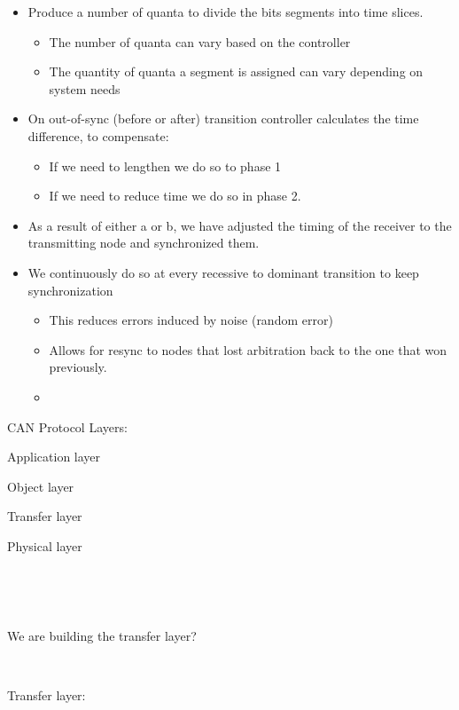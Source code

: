 \begin{itemize}
\item
  Produce a number of quanta to divide the bits\textquotesingle{}
  segments into time slices.

  \begin{itemize}
  \item
    The number of quanta can vary based on the controller
  \item
    The quantity of quanta a segment is assigned can vary depending on
    system needs
  \end{itemize}
\item
  On out-of-sync (before or after) transition controller calculates the time
  difference, to compensate:

  \begin{itemize}
  \item
    If we need to lengthen we do so to phase 1
  \item
    If we need to reduce time we do so in phase 2.
  \end{itemize}
\item
  As a result of either a or b, we have adjusted the timing of the
  receiver to the transmitting node and synchronized them.
\item
  We continuously do so at every recessive to dominant transition to
  keep synchronization

  \begin{itemize}
  \item
    This reduces errors induced by noise (random error)
  \item
    Allows for resync to nodes that lost arbitration back to the one
    that won previously.
  \item
  \end{itemize}
\end{itemize}

CAN Protocol Layers:

Application layer

Object layer

Transfer layer

Physical layer

~

~

We are building the transfer layer?

~

Transfer layer:

